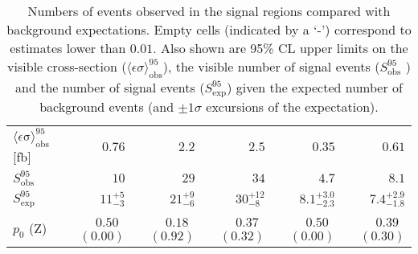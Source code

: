 \begin{table}[tbp]
\begin{center}
\begin{tabular}{|lrrrrr|}
$\langle\epsilon\mathrm{ \sigma}\rangle_\mathrm{ obs}^{95}$ [fb]   &$0.76$   & $2.2$ & $2.5$  & $0.35$ & $0.61$  \\
$S_\mathrm{ obs}^{95}$     & $10$ & $29$ &  $34$  & $4.7$ & $8.1$ \\
$S_\mathrm{ exp}^{95}$     & $ { 11 }^{ +5 }_{ -3 }$ &  $ { 21 }^{ +9 }_{ -6 }$ & $ { 30 }^{ +12 }_{ -8 }$ & $ { 8.1 }^{ +3.0 }_{ -2.3 }$ & $ { 7.4 }^{ +2.9 }_{ -1.8 }$ \\
$p_{0}$ ($\mathrm{Z}$)        & $ 0.50$~$(0.00)$  & $ 0.18$~$(0.92)$ & $ 0.37$~$(0.32)$ & $ 0.50$~$(0.00)$  & $ 0.39$~$(0.30)$ \\
\hline
\end{tabular}


\vspace*{-0.01\textheight}\caption[p0 and UL]{Numbers of events observed in the signal regions compared with background expectations.
Empty cells (indicated by a `-') correspond to estimates lower than $0.01$.
Also shown are 95\% CL upper limits on the visible cross-section ($\langle\epsilon\sigma\rangle_\mathrm{ obs}^{95}$),
the visible number of signal events ($S_\mathrm{ obs}^{95}$ ) and the number of signal events ($S_\mathrm{ exp}^{95}$)
given the expected number of background events (and $\pm 1\sigma$ excursions of the expectation).
\label{tab:p0_UL_RJR}}
\end{center}
\end{table}
